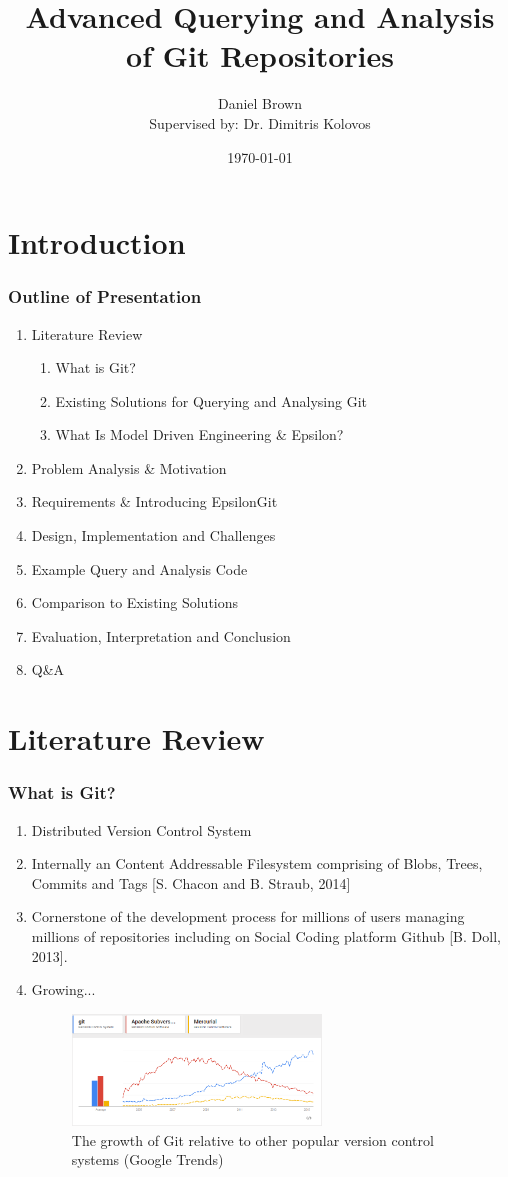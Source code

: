 \documentclass[aspectratio=1610]{beamer}
\title[EpsilonGit]{Advanced Querying and Analysis of Git Repositories}
\author[Daniel Brown]{Daniel Brown\\{\footnotesize Supervised by: Dr. Dimitris Kolovos}}
\institute[UoY, CS]{The University of York, Department of Computer Science}
\date{\today}
\begin{document}
\frame{\titlepage}

\section{Introduction} %
\begin{frame}
	\frametitle{Outline of Presentation}
	\begin{enumerate}
		\item Literature Review \begin{enumerate}
									\item What is Git?
									\item Existing Solutions for Querying and Analysing Git
									\item What Is Model Driven Engineering \& Epsilon?
								\end{enumerate} 
		\item Problem Analysis \& Motivation
		\item Requirements \& Introducing EpsilonGit
		\item Design, Implementation and Challenges
		\item Example Query and Analysis Code
		\item Comparison to Existing Solutions
		\item Evaluation, Interpretation and Conclusion
		\item Q\&A
	\end{enumerate}
\end{frame}

\section{Literature Review}
\begin{frame}
	\frametitle{What is Git?}
	\begin{enumerate}
		\item Distributed Version Control System
		\item Internally an Content Addressable Filesystem comprising of Blobs, Trees, Commits and Tags [S. Chacon and B. Straub, 2014]
		\item Cornerstone of the development process for millions of users managing millions of repositories including on Social Coding platform Github [B. Doll, 2013].
		\item Growing...
	\begin{figure}[H]
		\centering
		\includegraphics[width=250px]{images/git-google-trends.png}
		\caption{The growth of Git relative to other popular version control systems (Google Trends)}
	\end{figure}
	\end{enumerate}
\end{frame}
\end{document}

